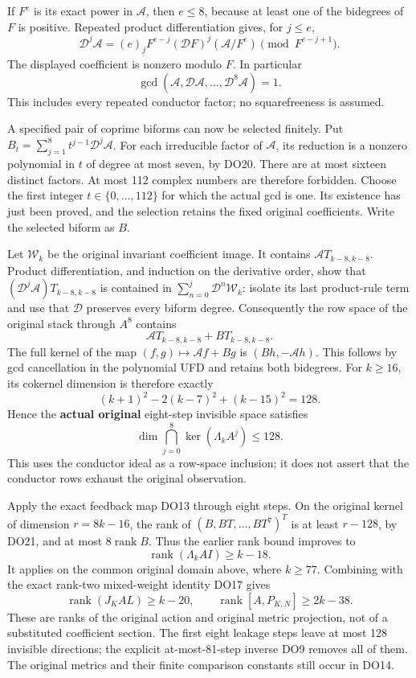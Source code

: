 If \(F^e\) is its exact power in \(\mathcal A\), then \(e\le8\), because at least one of the bidegrees of \(F\) is positive. Repeated product differentiation gives, for \(j\le e\), \[
\mathcal D^j\mathcal A
=(e)_{\underline j}F^{e-j}(\mathcal DF)^j(\mathcal A/F^e)
\pmod {F^{e-j+1}}.
\] The displayed coefficient is nonzero modulo \(F\). In particular \[
\gcd(\mathcal A,\mathcal D\mathcal A,\ldots,\mathcal D^8\mathcal A)=1.
\tag{DO20}
\] This includes every repeated conductor factor; no squarefreeness is assumed.

A specified pair of coprime biforms can now be selected finitely. Put \(B_t=\sum_{j=1}^8t^{j-1}\mathcal D^j\mathcal A\). For each irreducible factor of \(\mathcal A\), its reduction is a nonzero polynomial in \(t\) of degree at most seven, by DO20. There are at most sixteen distinct factors. At most 112 complex numbers are therefore forbidden. Choose the first integer \(t\in\{0,\ldots,112\}\) for which the actual gcd is one. Its existence has just been proved, and the selection retains the fixed original coefficients. Write the selected biform as \(B\).

Let \(\mathcal W_k\) be the original invariant coefficient image. It contains \(\mathcal A T_{k-8,k-8}\). Product differentiation, and induction on the derivative order, show that \((\mathcal D^j\mathcal A)T_{k-8,k-8}\) is contained in \(\sum_{n=0}^j\mathcal D^n\mathcal W_k\): isolate its last product-rule term and use that \(\mathcal D\) preserves every biform degree. Consequently the row space of the original stack through \(A^8\) contains \[
\mathcal A T_{k-8,k-8}+B T_{k-8,k-8}.
\] The full kernel of the map \((f,g)\mapsto\mathcal Af+Bg\) is \((Bh,-\mathcal Ah)\). This follows by gcd cancellation in the polynomial UFD and retains both bidegrees. For \(k\ge16\), its cokernel dimension is therefore exactly \[
(k+1)^2-2(k-7)^2+(k-15)^2=128.
\] Hence the \textbf{actual original} eight-step invisible space satisfies \[
\boxed{\displaystyle
\dim\bigcap_{j=0}^8\ker(\Lambda_k A^j)\le128.}
\tag{DO21}
\] This uses the conductor ideal as a row-space inclusion; it does not assert that the conductor rows exhaust the original observation.

Apply the exact feedback map DO13 through eight steps. On the original kernel of dimension \(r=8k-16\), the rank of \((B,BT,\ldots,BT^7)^T\) is at least \(r-128\), by DO21, and at most \(8\operatorname{rank}B\). Thus the earlier rank bound improves to \[
\boxed{\displaystyle
\operatorname{rank}(\Lambda_k AI)\ge k-18.}
\tag{DO22}
\] It applies on the common original domain above, where \(k\ge77\). Combining with the exact rank-two mixed-weight identity DO17 gives \[
\boxed{\displaystyle
\operatorname{rank}(J_KAL)\ge k-20,\qquad
\operatorname{rank}[A,P_{K,N}]\ge2k-38.}
\tag{DO23}
\] These are ranks of the original action and original metric projection, not of a substituted coefficient section. The first eight leakage steps leave at most 128 invisible directions; the explicit at-most-81-step inverse DO9 removes all of them. The original metrics and their finite comparison constants still occur in DO14.

